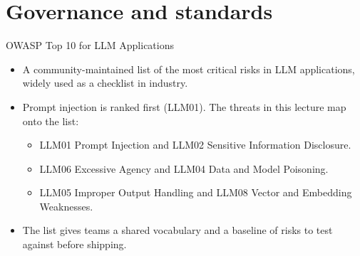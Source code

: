 \section{Governance and standards}

\begin{frame}{OWASP Top 10 for LLM Applications}
  \begin{itemize}\itemsep0.5em
    \item[\textcolor{KAred}{$\blacktriangleright$}] A community-maintained list of the most critical risks in LLM applications, widely used as a checklist in industry.
    \item[\textcolor{KAred}{$\blacktriangleright$}] Prompt injection is ranked first (LLM01). The threats in this lecture map onto the list:
      \begin{itemize}\footnotesize\itemsep0.25em
        \item LLM01 Prompt Injection and LLM02 Sensitive Information Disclosure.
        \item LLM06 Excessive Agency and LLM04 Data and Model Poisoning.
        \item LLM05 Improper Output Handling and LLM08 Vector and Embedding Weaknesses.
      \end{itemize}
    \item[\textcolor{KAred}{$\blacktriangleright$}] The list gives teams a shared vocabulary and a baseline of risks to test against before shipping.
  \end{itemize}
\end{frame}

